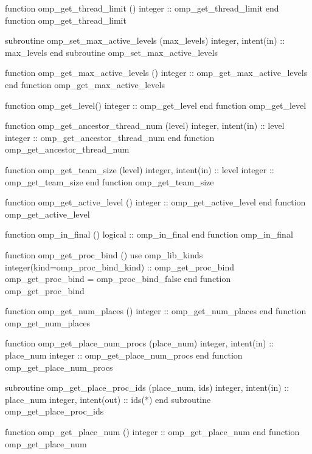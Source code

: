 {\begin{codepar}
          function omp\_get\_thread\_limit ()
           integer :: omp\_get\_thread\_limit
          end function omp\_get\_thread\_limit

          subroutine omp\_set\_max\_active\_levels (max\_levels)
           integer, intent(in) :: max\_levels
          end subroutine omp\_set\_max\_active\_levels

          function omp\_get\_max\_active\_levels ()
           integer :: omp\_get\_max\_active\_levels
          end function omp\_get\_max\_active\_levels

          function omp\_get\_level()
           integer :: omp\_get\_level
          end function omp\_get\_level

          function omp\_get\_ancestor\_thread\_num (level)
           integer, intent(in) :: level
           integer :: omp\_get\_ancestor\_thread\_num
          end function omp\_get\_ancestor\_thread\_num

          function omp\_get\_team\_size (level)
           integer, intent(in) :: level
           integer :: omp\_get\_team\_size
          end function omp\_get\_team\_size

          function omp\_get\_active\_level ()
           integer :: omp\_get\_active\_level
          end function omp\_get\_active\_level

          function omp\_in\_final ()
           logical :: omp\_in\_final
          end function omp\_in\_final

          function omp\_get\_proc\_bind ()
           use omp\_lib\_kinds
           integer(kind=omp\_proc\_bind\_kind) :: omp\_get\_proc\_bind
           omp\_get\_proc\_bind = omp\_proc\_bind\_false
          end function omp\_get\_proc\_bind

          function omp\_get\_num\_places ()
          integer :: omp\_get\_num\_places
          end function omp\_get\_num\_places

          function omp\_get\_place\_num\_procs (place\_num)
          integer, intent(in) :: place\_num
          integer :: omp\_get\_place\_num\_procs
          end function omp\_get\_place\_num\_procs

          subroutine omp\_get\_place\_proc\_ids (place\_num, ids)
          integer, intent(in) :: place\_num
          integer, intent(out) :: ids(*)
          end subroutine omp\_get\_place\_proc\_ids

          function omp\_get\_place\_num ()
          integer :: omp\_get\_place\_num
          end function omp\_get\_place\_num


\end{codepar}}
